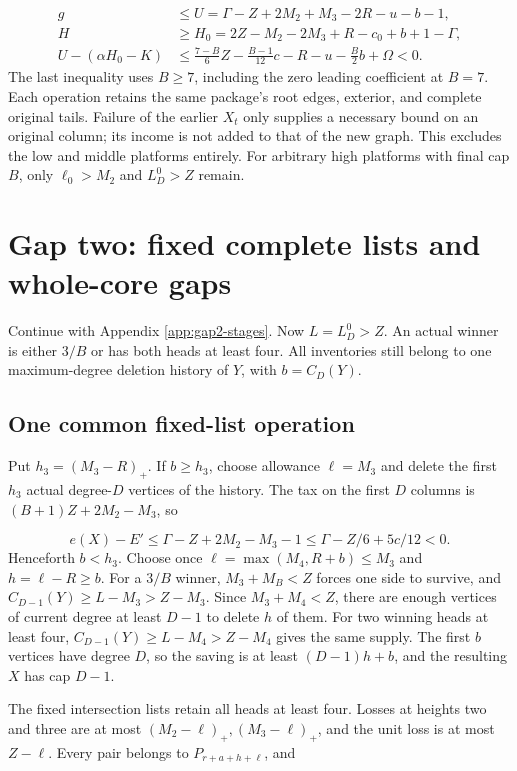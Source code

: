\documentclass[11pt,a4paper]{article}
\theoremstyle{definition}
\begin{document}
\[
\begin{split}
g&\le U=\Gamma-Z+2M_2+M_3-2R-u-b-1,\\
H&\ge H_0=2Z-M_2-2M_3+R-c_0+b+1-\Gamma,\\
U-(\alpha H_0-K)
&\le\frac{7-B}{6}Z-\frac{B-1}{12}c-R-u-\frac B2b+\Omega<0 .
\end{split}
\]
The last inequality uses $B\ge7$, including the zero leading coefficient at $B=7$.
Each operation retains the same package's root edges, exterior, and complete
original tails. Failure of the earlier $X_t$ only supplies a necessary bound
on an original column; its income is not added to that of the new graph.
This excludes the low and middle platforms entirely.
For arbitrary high platforms with final cap $B$, only
$\ell_0>M_2$ and $L_D^0>Z$ remain.

\section{Gap two: fixed complete lists and whole-core gaps}\label{app:gap2-high}
Continue with Appendix \ref{app:gap2-stages}. Now $L=L_D^0>Z$.
An actual winner is either $3/B$ or has both heads at least four.
All inventories still belong to one maximum-degree deletion history of $Y$,
with $b=C_D(Y)$.

\subsection{One common fixed-list operation}
Put $h_3=(M_3-R)_+$.
If $b\ge h_3$, choose allowance $\ell=M_3$ and delete the first $h_3$
actual degree-$D$ vertices of the history.
The tax on the first $D$ columns is $(B+1)Z+2M_2-M_3$, so

\[
e(X)-E'\le\Gamma-Z+2M_2-M_3-1
\le\Gamma-Z/6+5c/12<0.
\]
Henceforth $b<h_3$. Choose once
$\ell=\max(M_4,R+b)\le M_3$ and $h=\ell-R\ge b$.
For a $3/B$ winner, $M_3+M_B<Z$ forces one side to survive,
and $C_{D-1}(Y)\ge L-M_3>Z-M_3$.
Since $M_3+M_4<Z$, there are enough vertices of current degree at least $D-1$
to delete $h$ of them.
For two winning heads at least four,
$C_{D-1}(Y)\ge L-M_4>Z-M_4$ gives the same supply.
The first $b$ vertices have degree $D$, so the saving is at least $(D-1)h+b$,
and the resulting $X$ has cap $D-1$.

The fixed intersection lists retain all heads at least four.
Losses at heights two and three are at most
$(M_2-\ell)_+,(M_3-\ell)_+$, and the unit loss is at most $Z-\ell$.
Every pair belongs to $P_{r+a+h+\ell}$, and
\end{document}
